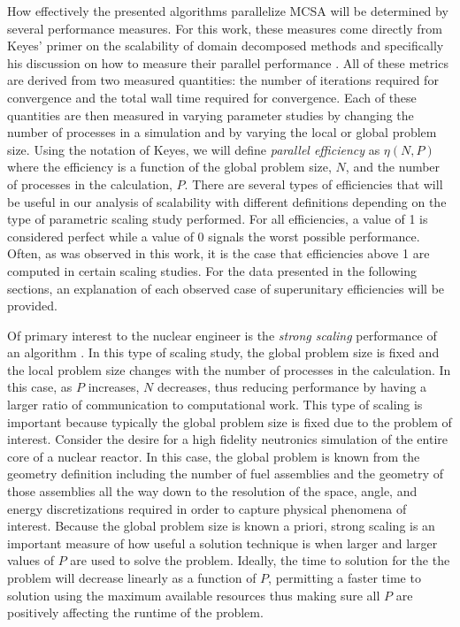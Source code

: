 How effectively the presented algorithms parallelize MCSA will be
determined by several performance measures. For this work, these
measures come directly from Keyes' primer on the scalability of domain
decomposed methods and specifically his discussion on how to measure
their parallel performance \citep{keyes_how_1999}. All of these
metrics are derived from two measured quantities: the number of
iterations required for convergence and the total wall time required
for convergence. Each of these quantities are then measured in varying
parameter studies by changing the number of processes in a simulation
and by varying the local or global problem size. Using the notation of
Keyes, we will define \textit{parallel efficiency} as $\eta(N,P)$
where the efficiency is a function of the global problem size, $N$,
and the number of processes in the calculation, $P$. There are several
types of efficiencies that will be useful in our analysis of
scalability with different definitions depending on the type of
parametric scaling study performed. For all efficiencies, a value of 1
is considered perfect while a value of 0 signals the worst possible
performance. Often, as was observed in this work, it is the case that
efficiencies above 1 are computed in certain scaling studies. For the
data presented in the following sections, an explanation of each
observed case of superunitary efficiencies will be provided.

Of primary interest to the nuclear engineer is the \textit{strong
  scaling} performance of an algorithm
\citep{siegel_analysis_2012}. In this type of scaling study, the
global problem size is fixed and the local problem size changes with
the number of processes in the calculation. In this case, as $P$
increases, $N$ decreases, thus reducing performance by having a larger
ratio of communication to computational work. This type of scaling is
important because typically the global problem size is fixed due to
the problem of interest. Consider the desire for a high fidelity
neutronics simulation of the entire core of a nuclear reactor. In this
case, the global problem is known from the geometry definition
including the number of fuel assemblies and the geometry of those
assemblies all the way down to the resolution of the space, angle, and
energy discretizations required in order to capture physical phenomena
of interest. Because the global problem size is known a priori, strong
scaling is an important measure of how useful a solution technique is
when larger and larger values of $P$ are used to solve the
problem. Ideally, the time to solution for the the problem will
decrease linearly as a function of $P$, permitting a faster time to
solution using the maximum available resources thus making sure all
$P$ are positively affecting the runtime of the problem.

